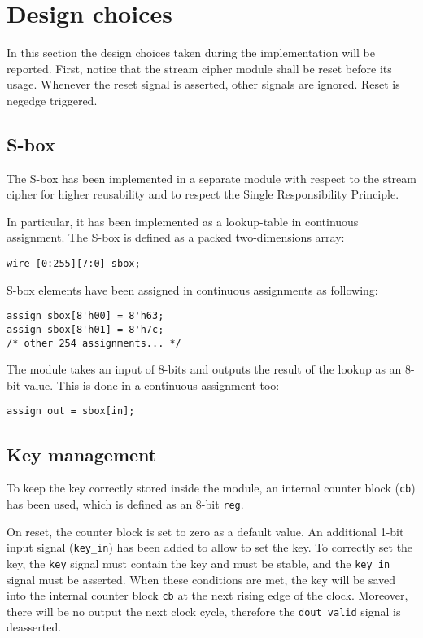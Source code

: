 \section{Design choices}
In this section the design choices taken during the implementation will be reported. First, notice that the stream cipher module shall be reset before its usage. Whenever the reset signal is asserted, other signals are ignored. Reset is negedge triggered.

\subsection{S-box}
The S-box has been implemented in a separate module with respect to the stream cipher for higher reusability and to respect the Single Responsibility Principle.

In particular, it has been implemented as a lookup-table in continuous assignment. The S-box is defined as a packed two-dimensions array:
\begin{lstlisting}
wire [0:255][7:0] sbox;
\end{lstlisting}
S-box elements have been assigned in continuous assignments as following:
\begin{lstlisting}
assign sbox[8'h00] = 8'h63;
assign sbox[8'h01] = 8'h7c;
/* other 254 assignments... */
\end{lstlisting}
The module takes an input of 8-bits and outputs the result of the lookup as an 8-bit value. This is done in a continuous assignment too:
\begin{lstlisting}
assign out = sbox[in];
\end{lstlisting}

\subsection{Key management}

To keep the key correctly stored inside the module, an internal counter block (\lstinline{cb}) has been used, which is defined as an 8-bit \lstinline{reg}.

On reset, the counter block is set to zero as a default value. An additional 1-bit input signal (\lstinline{key_in}) has been added to allow to set the key. To correctly set the key, the \lstinline{key} signal must contain the key and must be stable, and the \lstinline{key_in} signal must be asserted. When these conditions are met, the key will be saved into the internal counter block \lstinline{cb} at the next rising edge of the clock. Moreover, there will be no output the next clock cycle, therefore the \lstinline{dout_valid} signal is deasserted.

